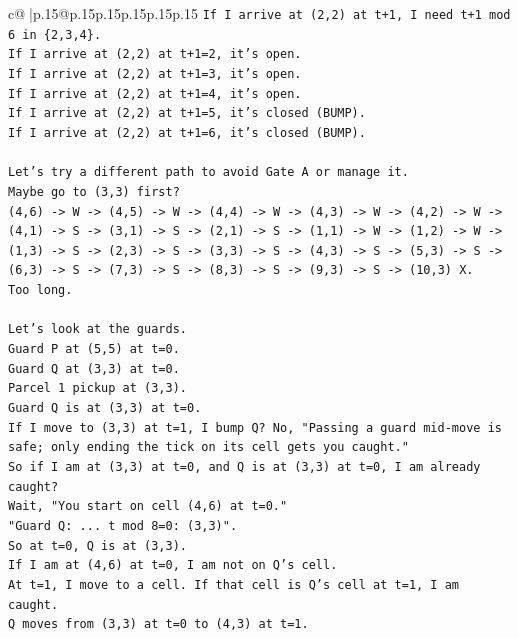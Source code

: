 \documentclass{article}
\begin{document}
{\begin{supertabular}{c@{$\;$}|p{.15\linewidth}@{}p{.15\linewidth}p{.15\linewidth}p{.15\linewidth}p{.15\linewidth}p{.15\linewidth}}
{{{\texttt{If I arrive at (2,2) at t+1, I need t+1 mod 6 in \{2,3,4\}.} \\
\texttt{If I arrive at (2,2) at t+1=2, it's open.} \\
\texttt{If I arrive at (2,2) at t+1=3, it's open.} \\
\texttt{If I arrive at (2,2) at t+1=4, it's open.} \\
\texttt{If I arrive at (2,2) at t+1=5, it's closed (BUMP).} \\
\texttt{If I arrive at (2,2) at t+1=6, it's closed (BUMP).} \\
\\ 
\texttt{Let's try a different path to avoid Gate A or manage it.} \\
\texttt{Maybe go to (3,3) first?} \\
\texttt{(4,6) {-}> W {-}> (4,5) {-}> W {-}> (4,4) {-}> W {-}> (4,3) {-}> W {-}> (4,2) {-}> W {-}> (4,1) {-}> S {-}> (3,1) {-}> S {-}> (2,1) {-}> S {-}> (1,1) {-}> W {-}> (1,2) {-}> W {-}> (1,3) {-}> S {-}> (2,3) {-}> S {-}> (3,3) {-}> S {-}> (4,3) {-}> S {-}> (5,3) {-}> S {-}> (6,3) {-}> S {-}> (7,3) {-}> S {-}> (8,3) {-}> S {-}> (9,3) {-}> S {-}> (10,3) X.} \\
\texttt{Too long.} \\
\\ 
\texttt{Let's look at the guards.} \\
\texttt{Guard P at (5,5) at t=0.} \\
\texttt{Guard Q at (3,3) at t=0.} \\
\texttt{Parcel 1 pickup at (3,3).} \\
\texttt{Guard Q is at (3,3) at t=0.} \\
\texttt{If I move to (3,3) at t=1, I bump Q? No, "Passing a guard mid{-}move is safe; only ending the tick on its cell gets you caught."} \\
\texttt{So if I am at (3,3) at t=0, and Q is at (3,3) at t=0, I am already caught?} \\
\texttt{Wait, "You start on cell (4,6) at t=0."} \\
\texttt{"Guard Q: ... t mod 8=0: (3,3)".} \\
\texttt{So at t=0, Q is at (3,3).} \\
\texttt{If I am at (4,6) at t=0, I am not on Q's cell.} \\
\texttt{At t=1, I move to a cell. If that cell is Q's cell at t=1, I am caught.} \\
\texttt{Q moves from (3,3) at t=0 to (4,3) at t=1.} \\
}}}
\end{supertabular}}
\end{document}
